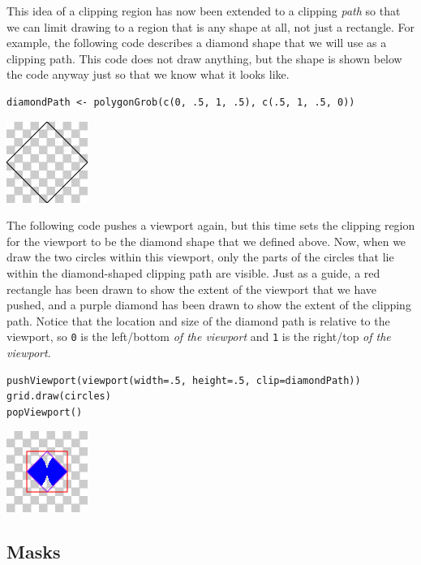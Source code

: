 This idea of a clipping region has now been extended to a clipping \emph{path}
so that we can limit drawing to a region that is any shape at all,
not just a rectangle.
For example, the following code describes a diamond shape
that we will use as a clipping path. This code does not draw anything,
but the shape is shown below the code anyway just so that we know what it looks
like.

\begin{verbatim}
diamondPath <- polygonGrob(c(0, .5, 1, .5), c(.5, 1, .5, 0))
\end{verbatim}

\includegraphics{murrell-definitions-2023_files/figure-latex/unnamed-chunk-17-1.png}

The following code pushes a viewport again,
but this time sets the clipping region for the viewport
to be the diamond shape that we defined above.
Now, when we draw the two circles within this viewport,
only the parts of the circles that lie within the diamond-shaped
clipping path are visible.
Just as a guide, a red rectangle has been drawn to show the extent
of the viewport that we have pushed, and a purple diamond has been
drawn to show the extent of the clipping path. Notice that the
location and size of the diamond path is relative to the viewport,
so \texttt{0} is the left/bottom \emph{of the viewport} and \texttt{1} is the right/top \emph{of
the viewport}.

\begin{verbatim}
pushViewport(viewport(width=.5, height=.5, clip=diamondPath))
grid.draw(circles)
popViewport()
\end{verbatim}

\includegraphics{murrell-definitions-2023_files/figure-latex/unnamed-chunk-18-1.png}

\hypertarget{masks}{%
\subsection{Masks}\label{masks}}


